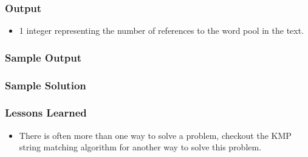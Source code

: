 \subsubsection{Output}
\begin{itemize}
	\item 1 integer representing the number of references to the word pool in the text.
\end{itemize}

\subsubsection{Sample Output}

\subsubsection{Sample Solution}

\subsubsection{Lessons Learned}
\begin{itemize}
	\item There is often more than one way to solve a problem,  checkout the KMP string matching algorithm for another way to solve this problem.
\end{itemize}
